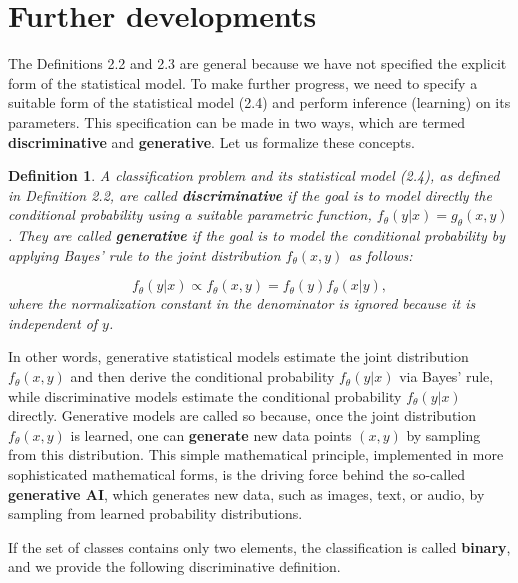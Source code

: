 \documentclass{report}
\newtheorem{definition}{Definition}[chapter]
\begin{document}
\section{Further developments}
The Definitions 2.2 and 2.3 are general because we have not specified the explicit form of the statistical model. To make further progress, we need to specify a suitable form of the statistical model (2.4) and perform inference (learning) on its parameters. This specification can be made in two ways, which are termed \textbf{discriminative} and \textbf{generative}. Let us formalize these concepts.

\begin{definition}
A classification problem and its statistical model (2.4), as defined in Definition 2.2, are called \textbf{discriminative} if the goal is to model directly the conditional probability using a suitable parametric function, $f_\theta(y|x) = g_\theta(x, y)$. They are called \textbf{generative} if the goal is to model the conditional probability by applying Bayes' rule to the joint distribution $f_\theta(x,y)$ as follows:

\begin{equation}
f_\theta(y|x) \propto f_\theta(x,y) = f_\theta(y)f_\theta(x|y),
\end{equation}
where the normalization constant in the denominator is ignored because it is independent of $y$.
\end{definition}
In other words, generative statistical models estimate the joint distribution $f_\theta(x,y)$ and then derive the conditional probability $f_\theta(y|x)$ via Bayes' rule, while discriminative models estimate the conditional probability $f_\theta(y|x)$ directly. Generative models are called so because, once the joint distribution $f_\theta(x,y)$ is learned, one can \textbf{generate} new data points $(x,y)$ by sampling from this distribution. This simple mathematical principle, implemented in more sophisticated mathematical forms, is the driving force behind the so-called \textbf{generative AI}, which generates new data, such as images, text, or audio, by sampling from learned probability distributions.

If the set of classes contains only two elements, the classification is called \textbf{binary}, and we provide the following discriminative definition.
\end{document}
